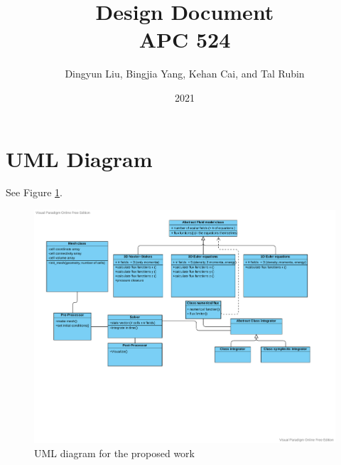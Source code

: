 \documentclass[aip, amsmath, amssymb, reprint,floatfix]{revtex4-2}
\begin{document}
\title{Design Document\\APC 524}
\date{2021}

\author{Dingyun Liu, Bingjia Yang, Kehan Cai, and Tal Rubin}
\maketitle






\section{UML Diagram}
See Figure \ref{fig:UML}.
\begin{figure}
\includegraphics[width = \linewidth]{APC524UML.pdf}
\caption{UML diagram for the proposed work} \label{fig:UML}
\end{figure}



\end{document}

